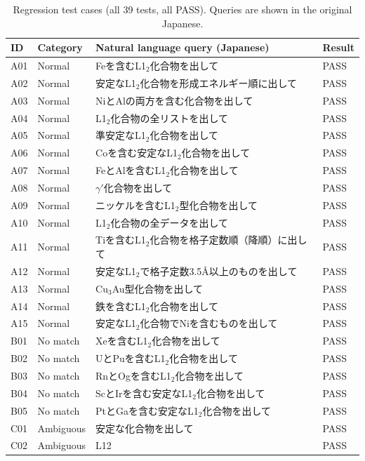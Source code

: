\documentclass{npj-compt.mater}
\begin{document}
\begin{table}[htbp]
\centering
\caption{Regression test cases (all 39 tests, all PASS). Queries are shown in the original Japanese.}
\label{tab:sup_all_tests}
\footnotesize
\begin{tabular}{llp{8cm}l}
  \toprule
  ID & Category & Natural language query (Japanese) & Result \\
  \midrule
  A01 & Normal & Feを含むL1$_2$化合物を出して & PASS \\
  A02 & Normal & 安定なL1$_2$化合物を形成エネルギー順に出して & PASS \\
  A03 & Normal & NiとAlの両方を含む化合物を出して & PASS \\
  A04 & Normal & L1$_2$化合物の全リストを出して & PASS \\
  A05 & Normal & 準安定なL1$_2$化合物を出して & PASS \\
  A06 & Normal & Coを含む安定なL1$_2$化合物を出して & PASS \\
  A07 & Normal & FeとAlを含むL1$_2$化合物を出して & PASS \\
  A08 & Normal & $\gamma'$化合物を出して & PASS \\
  A09 & Normal & ニッケルを含むL1$_2$型化合物を出して & PASS \\
  A10 & Normal & L1$_2$化合物の全データを出して & PASS \\
  A11 & Normal & Tiを含むL1$_2$化合物を格子定数順（降順）に出して & PASS \\
  A12 & Normal & 安定なL1$_2$で格子定数3.5\AA 以上のものを出して & PASS \\
  A13 & Normal & Cu$_3$Au型化合物を出して & PASS \\
  A14 & Normal & 鉄を含むL1$_2$化合物を出して & PASS \\
  A15 & Normal & 安定なL1$_2$化合物でNiを含むものを出して & PASS \\
  \midrule
  B01 & No match & Xeを含むL1$_2$化合物を出して & PASS \\
  B02 & No match & UとPuを含むL1$_2$化合物を出して & PASS \\
  B03 & No match & RnとOgを含むL1$_2$化合物を出して & PASS \\
  B04 & No match & ScとIrを含む安定なL1$_2$化合物を出して & PASS \\
  B05 & No match & PtとGaを含む安定なL1$_2$化合物を出して & PASS \\
  \midrule
  C01 & Ambiguous & 安定な化合物を出して & PASS \\
  C02 & Ambiguous & L12 & PASS \\

\end{tabular}
\end{table}
\end{document}
